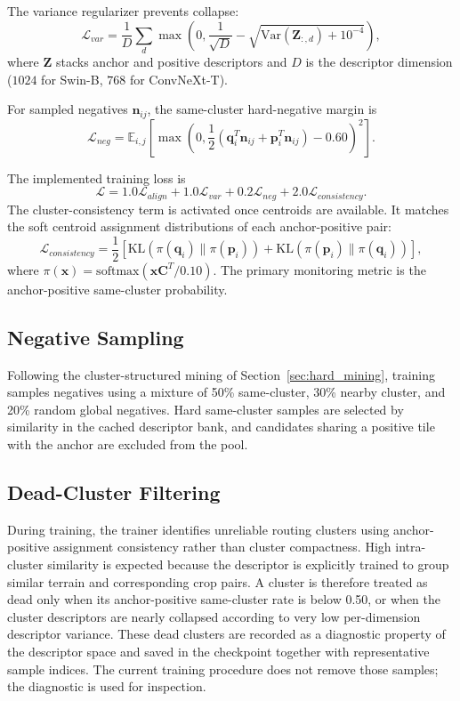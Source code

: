 \documentclass[conference]{IEEEtran}
\begin{document}
The variance regularizer prevents collapse:
\begin{equation}
\mathcal{L}_{var}=
\frac{1}{D}\sum_d
\max\left(0,\frac{1}{\sqrt{D}}-\sqrt{\mathrm{Var}(\mathbf{Z}_{:,d})+10^{-4}}\right),
\end{equation}
where $\mathbf{Z}$ stacks anchor and positive descriptors and $D$ is the
descriptor dimension ($1024$ for Swin-B, $768$ for ConvNeXt-T).

For sampled negatives $\mathbf{n}_{ij}$, the same-cluster hard-negative margin
is
\begin{equation}
\mathcal{L}_{neg} =
\mathbb{E}_{i,j}\left[
\max\left(0,
\frac{1}{2}(\mathbf{q}_i^T\mathbf{n}_{ij}
+\mathbf{p}_i^T\mathbf{n}_{ij})-0.60
\right)^2
\right].
\end{equation}

The implemented training loss is
\begin{equation}
\mathcal{L} =
1.0\mathcal{L}_{align}
+1.0\mathcal{L}_{var}
+0.2\mathcal{L}_{neg}
+2.0\mathcal{L}_{consistency}.
\end{equation}
The cluster-consistency term is activated once centroids are available. It
matches the soft centroid assignment distributions of each anchor-positive
pair:
\begin{equation}
\mathcal{L}_{consistency} =
\frac{1}{2}\left[
\mathrm{KL}(\pi(\mathbf{q}_i)\|\pi(\mathbf{p}_i))+
\mathrm{KL}(\pi(\mathbf{p}_i)\|\pi(\mathbf{q}_i))
\right],
\end{equation}
where $\pi(\mathbf{x})=\mathrm{softmax}(\mathbf{x}\mathbf{C}^{T}/0.10)$.
The primary monitoring metric is the anchor-positive same-cluster probability.

\subsection{Negative Sampling}
Following the cluster-structured mining of Section~\ref{sec:hard_mining},
training samples negatives using a mixture of 50\% same-cluster, 30\% nearby
cluster, and 20\% random global negatives. Hard same-cluster samples are
selected by similarity in the cached descriptor bank, and candidates sharing
a positive tile with the anchor are excluded from the pool.

\subsection{Dead-Cluster Filtering}
During training, the trainer identifies unreliable routing clusters using
anchor-positive assignment consistency rather than cluster compactness. High
intra-cluster similarity is expected because the descriptor is explicitly
trained to group similar terrain and corresponding crop pairs. A cluster is
therefore treated as dead only when its anchor-positive same-cluster rate is
below 0.50, or when the cluster descriptors are nearly collapsed according to
very low per-dimension descriptor variance. These dead clusters are recorded
as a diagnostic property of the descriptor space and saved in the checkpoint
together with representative sample indices. The current training procedure
does not remove those samples; the diagnostic is used for inspection.
\end{document}
